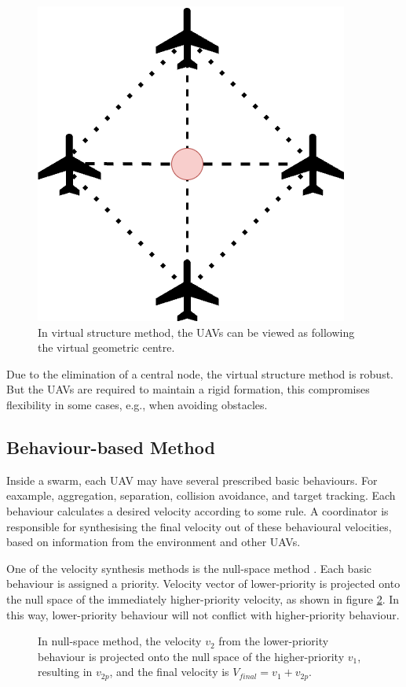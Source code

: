\begin{figure}[htbp]
  \centering
  \includegraphics[width=0.4\linewidth]{rsc/virtual_structure_method.png}
  \caption[Virtual structure method.]
  {In virtual structure method, the UAVs can be viewed as
  following the virtual geometric centre.}
  \label{fig:virtual_structure}
\end{figure}

Due to the elimination of a central node, the virtual structure method is robust.
But the UAVs are required to maintain a rigid formation,
this compromises flexibility in some cases, e.g., when avoiding obstacles.

\subsection{Behaviour-based Method}

Inside a swarm, each UAV may have several prescribed basic behaviours.
For eaxample, aggregation, separation, collision avoidance, and target tracking.
Each behaviour calculates a desired velocity according to some rule.
A coordinator is responsible for synthesising the final velocity out of these
behavioural velocities, based on information from the environment and other UAVs.

One of the velocity synthesis methods is the null-space
method \parencite{Arrichiello2010, Falconi2008, Antonelli2005, Bishop2001}.
Each basic behaviour is assigned a priority.
Velocity vector of lower-priority is projected onto the null space
of the immediately higher-priority velocity, as shown in figure \ref{fig:null_space}.
In this way, lower-priority behaviour will not conflict with higher-priority behaviour.

\begin{figure}[htbp]
  \centering
  \caption[Null-space method.]
  {In null-space method, the velocity $v_2$ from the lower-priority behaviour
  is projected onto the null space of the higher-priority $v_1$,
  resulting in $v_{2p}$, and the final velocity is $V_{final} = v_1 + v_{2p}$.}
  \label{fig:null_space}
\end{figure}

